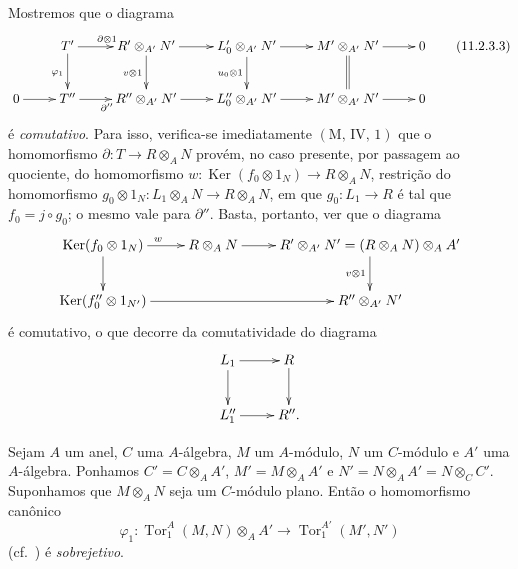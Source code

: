 Mostremos que o diagrama
\begin{equation}
\xymatrix{
&T'\ar[r]^{\partial\otimes1}\ar[d]_{\varphi_1}&
R'\otimes_{A'}N'\ar[r]\ar[d]_{v\otimes1}&
L'_0\otimes_{A'}N'\ar[r]\ar[d]_{u_0\otimes1}&
M'\otimes_{A'}N'\ar[r]\ar@{=}[d]&0\\
0\ar[r]&T''\ar[r]_{\partial''}&R''\otimes_{A'}N'\ar[r]&
L''_0\otimes_{A'}N'\ar[r]&M'\otimes_{A'}N'\ar[r]&0
}
\label{IV.11.2.3.3}
\tag{11.2.3.3}
\end{equation}
é \emph{comutativo}. Para isso, verifica-se imediatamente $(\mathrm M,\,\mathrm{IV},\,1)$ que o homomorfismo $\partial:T\to R\otimes_AN$ provém, no caso presente, por passagem ao quociente, do homomorfismo $w:\operatorname{Ker}(f_0\otimes1_N)\to R\otimes_AN$, restrição do homomorfismo $g_0\otimes1_N:L_1\otimes_AN\to R\otimes_AN$, em que $g_0:L_1\to R$ é tal que $f_0=j\circ g_0$; o mesmo vale para $\partial''$. Basta, portanto, ver que o diagrama
\[
\xymatrix{
\operatorname{Ker}(f_0\otimes1_N)\ar[r]^w\ar[d]&R\otimes_AN\ar[r]&
R'\otimes_{A'}N'=(R\otimes_AN)\otimes_AA'\ar[d]_{v\otimes1}\\
\operatorname{Ker}(f''_0\otimes1_{N'})\ar[rr]&&R''\otimes_{A'}N'
}
\]
é comutativo, o que decorre da comutatividade do diagrama
\[
\xymatrix{
L_1\ar[r]\ar[d]&R\ar[d]\\
L''_1\ar[r]&R''.
}
\]

\begin{lemma}[11.2.4]
\label{IV.11.2.4}
Sejam $A$ um anel, $C$ uma $A$-álgebra, $M$ um $A$-módulo, $N$ um $C$-módulo e $A'$ uma $A$-álgebra. Ponhamos $C'=C\otimes_AA'$, $M'=M\otimes_AA'$ e $N'=N\otimes_AA'=N\otimes_CC'$. Suponhamos que $M\otimes_AN$ seja um $C$-módulo plano. Então o homomorfismo canônico
\[
\varphi_1:\operatorname{Tor}_1^A(M,N)\otimes_AA'
\to\operatorname{Tor}_1^{A'}(M',N')
\]
(cf.\ ) é \emph{sobrejetivo}.
\end{lemma}


